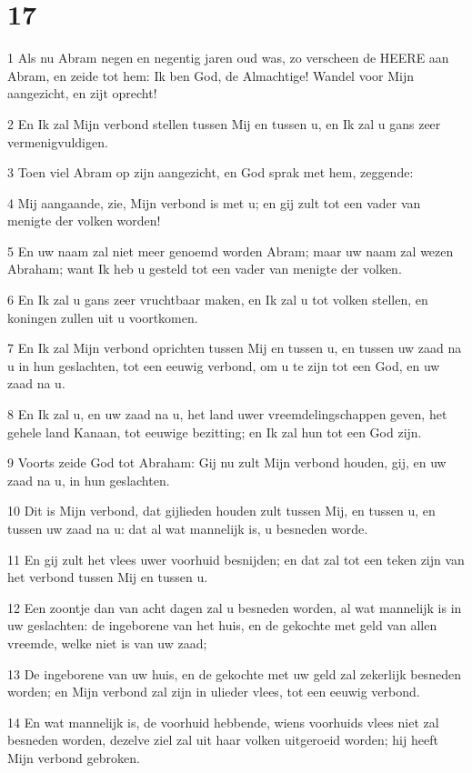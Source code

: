 \chapter{17}

\par 1 Als nu Abram negen en negentig jaren oud was, zo verscheen de HEERE aan Abram, en zeide tot hem: Ik ben God, de Almachtige! Wandel voor Mijn aangezicht, en zijt oprecht!
\par 2 En Ik zal Mijn verbond stellen tussen Mij en tussen u, en Ik zal u gans zeer vermenigvuldigen.
\par 3 Toen viel Abram op zijn aangezicht, en God sprak met hem, zeggende:
\par 4 Mij aangaande, zie, Mijn verbond is met u; en gij zult tot een vader van menigte der volken worden!
\par 5 En uw naam zal niet meer genoemd worden Abram; maar uw naam zal wezen Abraham; want Ik heb u gesteld tot een vader van menigte der volken.
\par 6 En Ik zal u gans zeer vruchtbaar maken, en Ik zal u tot volken stellen, en koningen zullen uit u voortkomen.
\par 7 En Ik zal Mijn verbond oprichten tussen Mij en tussen u, en tussen uw zaad na u in hun geslachten, tot een eeuwig verbond, om u te zijn tot een God, en uw zaad na u.
\par 8 En Ik zal u, en uw zaad na u, het land uwer vreemdelingschappen geven, het gehele land Kanaan, tot eeuwige bezitting; en Ik zal hun tot een God zijn.
\par 9 Voorts zeide God tot Abraham: Gij nu zult Mijn verbond houden, gij, en uw zaad na u, in hun geslachten.
\par 10 Dit is Mijn verbond, dat gijlieden houden zult tussen Mij, en tussen u, en tussen uw zaad na u: dat al wat mannelijk is, u besneden worde.
\par 11 En gij zult het vlees uwer voorhuid besnijden; en dat zal tot een teken zijn van het verbond tussen Mij en tussen u.
\par 12 Een zoontje dan van acht dagen zal u besneden worden, al wat mannelijk is in uw geslachten: de ingeborene van het huis, en de gekochte met geld van allen vreemde, welke niet is van uw zaad;
\par 13 De ingeborene van uw huis, en de gekochte met uw geld zal zekerlijk besneden worden; en Mijn verbond zal zijn in ulieder vlees, tot een eeuwig verbond.
\par 14 En wat mannelijk is, de voorhuid hebbende, wiens voorhuids vlees niet zal besneden worden, dezelve ziel zal uit haar volken uitgeroeid worden; hij heeft Mijn verbond gebroken.
